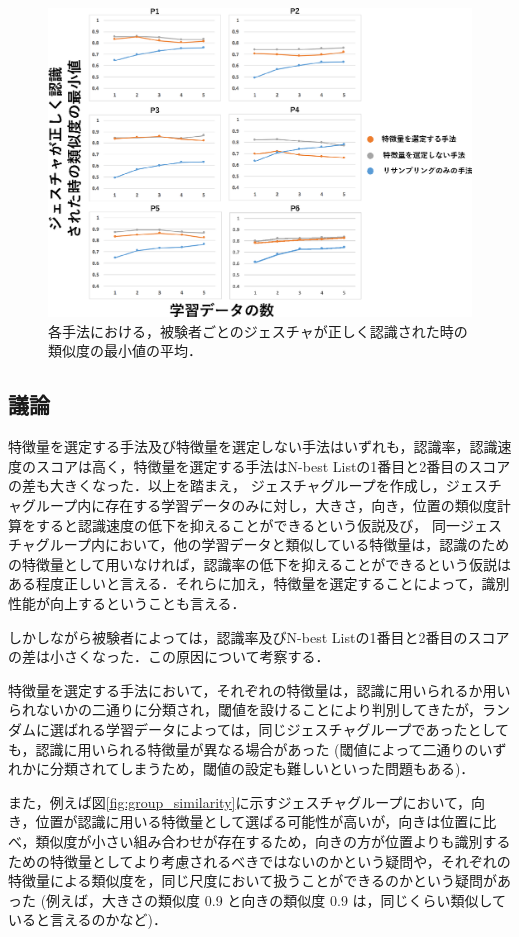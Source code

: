 \begin{figure}[!h]
\centering
\includegraphics[width=0.9\columnwidth]{img/pre_min.eps}
\caption{各手法における，被験者ごとのジェスチャが正しく認識された時の類似度の最小値の平均．}
\label{fig:rare_min}
\end{figure}

\newpage
\subsection{議論}

特徴量を選定する手法及び特徴量を選定しない手法はいずれも，認識率，認識速度のスコアは高く，特徴量を選定する手法はN-best Listの1番目と2番目のスコアの差も大きくなった．以上を踏まえ，
ジェスチャグループを作成し，ジェスチャグループ内に存在する学習データのみに対し，大きさ，向き，位置の類似度計算をすると認識速度の低下を抑えることができるという仮説及び，
同一ジェスチャグループ内において，他の学習データと類似している特徴量は，認識のための特徴量として用いなければ，認識率の低下を抑えることができるという仮説はある程度正しいと言える．それらに加え，特徴量を選定することによって，識別性能が向上するということも言える．

しかしながら被験者によっては，認識率及びN-best Listの1番目と2番目のスコアの差は小さくなった．この原因について考察する．

特徴量を選定する手法において，それぞれの特徴量は，認識に用いられるか用いられないかの二通りに分類され，閾値を設けることにより判別してきたが，ランダムに選ばれる学習データによっては，同じジェスチャグループであったとしても，認識に用いられる特徴量が異なる場合があった (閾値によって二通りのいずれかに分類されてしまうため，閾値の設定も難しいといった問題もある)．

また，例えば図\ref{fig:group_similarity}に示すジェスチャグループにおいて，向き，位置が認識に用いる特徴量として選ばる可能性が高いが，向きは位置に比べ，類似度が小さい組み合わせが存在するため，向きの方が位置よりも識別するための特徴量としてより考慮されるべきではないのかという疑問や，それぞれの特徴量による類似度を，同じ尺度において扱うことができるのかという疑問があった (例えば，大きさの類似度 0.9 と向きの類似度 0.9 は，同じくらい類似していると言えるのかなど)．


